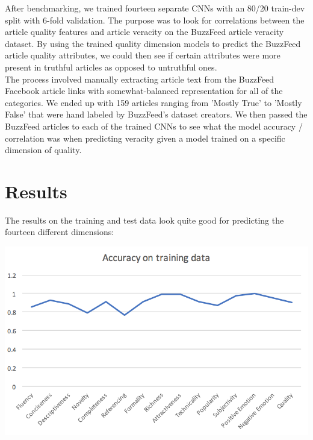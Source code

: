 \documentclass[11pt]{article}
\begin{document}
\indent After benchmarking, we trained fourteen separate CNNs with an 80/20 train-dev split with 6-fold validation.  The purpose was to look for correlations between the article quality features and article veracity on the BuzzFeed article veracity dataset.  By using the trained quality dimension models to predict the BuzzFeed article quality attributes, we could then see if certain attributes were more present in truthful articles as opposed to untruthful ones.\\
\indent The process involved manually extracting article text from the BuzzFeed Facebook article links with somewhat-balanced representation for all of the categories.  We ended up with 159 articles ranging from 'Mostly True' to 'Mostly False' that were hand labeled by BuzzFeed's dataset creators.
\indent We then passed the BuzzFeed articles to each of the trained CNNs to see what the model accuracy / correlation was when predicting veracity given a model trained on a specific dimension of quality.

\section{Results}

\indent \indent The results on the training and test data look quite good for predicting the fourteen different dimensions:
\begin{center}
	\includegraphics[scale=0.5]{Training.png}
\end{center}
\end{document}
